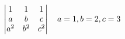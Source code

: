 \documentclass[preview]{standalone}
\begin{document}
\begin{align*}
\special{dvisvgm:raw <g id='unique000'>}\begin{vmatrix}1&1&1\\a&b&c\\a^2&b^2&c^2\end{vmatrix} \quad a=1,b=2,c=3\special{dvisvgm:raw </g>}
\end{align*}
\end{document}
